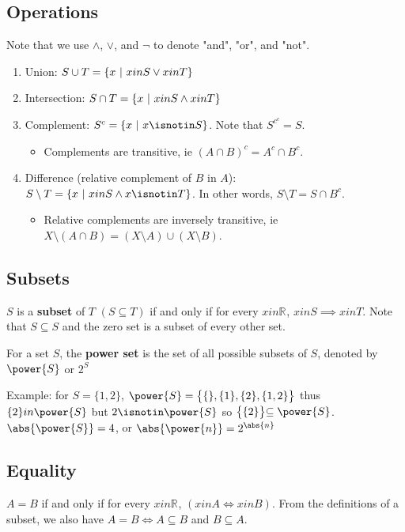 \documentclass[12pt]{article}
\newcommand{\R}[1]{\mathbb{R}^{#1}}
\begin{document}
\subsection*{Operations}
Note that we use $\land$, $\lor$, and $\neg$ to denote "and", "or", and "not".
\begin{enumerate}
\item Union: $S \cup T = \{ x \ |\  x in S \lor x in T \}$
\item Intersection: $S \cap T = \{ x \ |\  x in S \land x in T \}$
\item Complement: $S^c = \{ x \suchthat x \isnotin S \}$. Note that $S^{c^c} = S$.
\begin{itemize}
\item Complements are transitive, ie $(A \cap B)^c = A^c \cap B^c$.
\end{itemize}
\item Difference (relative complement of $B$ in $A$): $S \setminus T = \{ x \suchthat x in S \land x \isnotin T \}$. In other words, $S \setminus T = S \cap B^c$.
\begin{itemize}
\item Relative complements are inversely transitive, ie $X \setminus (A \cap B) = (X \setminus A) \cup (X \setminus B)$.
\end{itemize}
\end{enumerate}

\subsection*{Subsets}
 $S$ is a {\bf subset} of $T$ $(S \subseteq T)$ if and only if for every $x in \R{}$, $x in S \implies x in T$. Note that $S \subseteq S$ and the zero set is a subset of every other set.

For a set $S$, the {\bf power set} is the set of all possible subsets of $S$, denoted by $\power{S}$ or $2^S$

Example: for $S = \{ 1,2 \}$, $\power{S} = \bigl\{ \{\}, \{1\}, \{2\}, \{1,2\} \bigl\}$ thus $\{2\} in \power{S}$ but $2 \isnotin \power{S}$ so $\bigl\{ \{2\} \bigl\} \subseteq \power{S}$. $\abs{\power{S}} = 4$, or $\abs{\power{n}} = 2^{\abs{n}}$

\subsection*{Equality}
$A = B$ if and only if for every $x in \R{}$, $(x in A \iff x in B)$. From the definitions of a subset, we also have $A = B \iff A \subseteq B$ and $B \subseteq A$.
\end{document}
